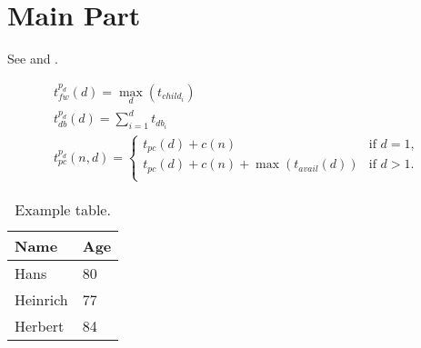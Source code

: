 \section{Main Part}\label{sec:main}

See  and .

\lstset{language=Java, caption=Example Code, label=lst:example}


\small
\begin{equation}
  \begin{array}{l}
    \displaystyle t^{p_d}_{fw}(d) = \max_{d}(t_{child_{i}}) \\
    \displaystyle t^{p_d}_{db}(d) = \sum_{i=1}^{d} t_{db_{i}} \\
    \displaystyle t^{p_d}_{pc}(n,d) =
    	\begin{cases}
        	t_{pc}(d) + c(n) & \text{if $d = 1$,}\\
        	t_{pc}(d) + c(n) + \max(t_{avail}(d)) & \text{if $d>1$.}\\
        \end{cases}
  \end{array}\label{eq:var_idb}
\end{equation}
\normalsize

\begin{table}
    \centering
    \caption{Example table.}
    \begin{tabular}{ll}\toprule
    \textbf{Name}  & \textbf{Age} \\ \midrule
    Hans           & 80             \\
    Heinrich       & 77             \\
    Herbert        & 84             \\ \bottomrule
    \end{tabular}\label{tbl:table1}
\end{table}

